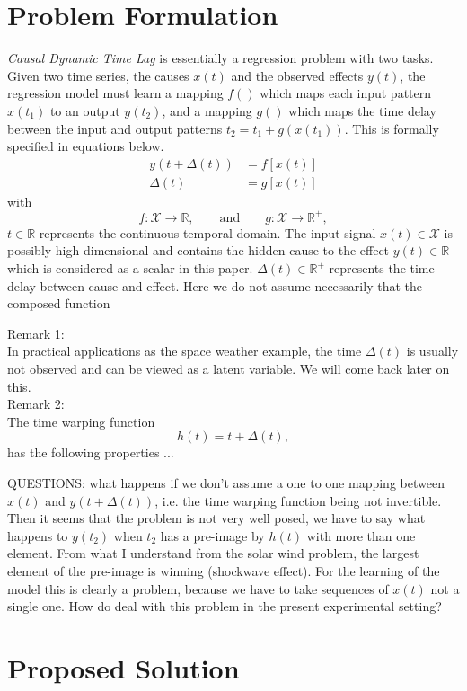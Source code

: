\documentclass[twoside]{article}
\begin{document}
\section{Problem Formulation}

\emph{Causal Dynamic Time Lag} is essentially a regression problem with two tasks. Given two time series, 
the causes $x(t)$ and the observed effects $y(t)$, the regression model must learn a mapping $f()$ which
maps each input pattern $x(t_1)$ to an output $y(t_2)$, and a mapping $g()$ which maps the time delay between
the input and output patterns $t_2 = t_1 + g(x(t_1))$. This is formally specified in equations below.
\begin{align}
y(t + \Delta(t)) & = f[x(t)]\label{eq:pb1}\\
\Delta(t) & = g[x(t)]\label{eq:pb2} 
\end{align}
with
\[
f: \mathcal{X}  \rightarrow \mathbb{R},\qquad\text{and}\qquad
g: \mathcal{X}  \rightarrow \mathbb{R}^{+},
\]
$t \in \mathbb{R}$ represents the continuous temporal domain. The input signal $x(t)\in \mathcal{X}$ is possibly high dimensional and contains the hidden cause to the effect $y(t)\in\mathbb{R}$ which is considered as a scalar in this paper. 
$\Delta(t)\in \mathbb{R}^+$ represents the time delay between cause and effect. Here we do not assume necessarily that the composed function 

Remark 1:\\
In practical applications as the space weather example, the time $\Delta(t)$ is usually  not observed  and can be viewed as a latent variable. We will come back later on this.\\[0.2cm]  
Remark 2:\\
The time warping function 
\[
h(t) = t+\Delta(t),
\]
has the following properties ... 

QUESTIONS: what happens if we don't assume a one to one mapping between $x(t)$
and $y(t+\Delta(t))$, i.e. the time warping function being not invertible. Then it seems that the problem is not very well posed, we have to say what happens to $y(t_2)$ when $t_2$ has a pre-image by $h(t)$ with more than one element.
From what I understand from the solar wind problem, the largest element of the pre-image is winning (shockwave effect). For the learning of the model this is clearly a problem, because we have to take sequences of $x(t)$ not a single one. How do deal with this problem in the present experimental setting?




\section{Proposed Solution}
\end{document}
